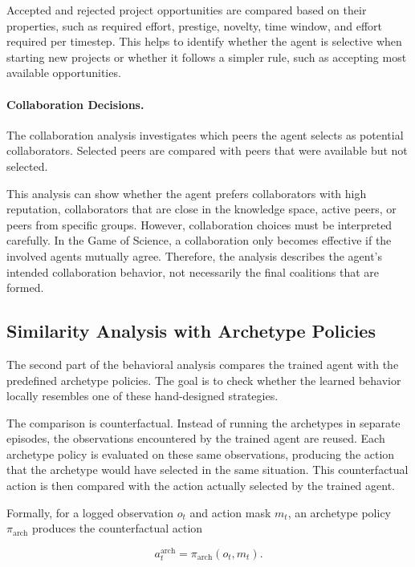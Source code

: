 \documentclass[english,bachelor]{hsluthesis}
\begin{document}
Accepted and rejected project opportunities are compared based on their properties, such as required effort, prestige, novelty, time window, and effort required per timestep. This helps to identify whether the agent is selective when starting new projects or whether it follows a simpler rule, such as accepting most available opportunities.

\paragraph{Collaboration Decisions.}
The collaboration analysis investigates which peers the agent selects as potential collaborators. Selected peers are compared with peers that were available but not selected.

This analysis can show whether the agent prefers collaborators with high reputation, collaborators that are close in the knowledge space, active peers, or peers from specific groups. However, collaboration choices must be interpreted carefully. In the Game of Science, a collaboration only becomes effective if the involved agents mutually agree. Therefore, the analysis describes the agent's intended collaboration behavior, not necessarily the final coalitions that are formed.

\subsection{Similarity Analysis with Archetype Policies}

The second part of the behavioral analysis compares the trained agent with the predefined archetype policies. The goal is to check whether the learned behavior locally resembles one of these hand-designed strategies.

The comparison is counterfactual. Instead of running the archetypes in separate episodes, the observations encountered by the trained agent are reused. Each archetype policy is evaluated on these same observations, producing the action that the archetype would have selected in the same situation. This counterfactual action is then compared with the action actually selected by the trained agent.

Formally, for a logged observation $o_t$ and action mask $m_t$, an archetype policy $\pi_{\text{arch}}$ produces the counterfactual action

\begin{equation}
a^{\text{arch}}_t = \pi_{\text{arch}}(o_t, m_t).
\end{equation}
\end{document}
